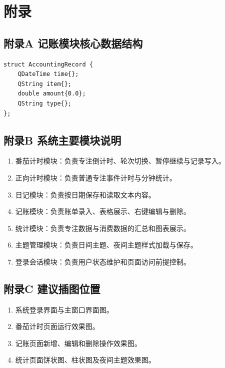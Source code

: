 \chapter{附录}

\section*{附录A 记账模块核心数据结构}

\begin{verbatim}
struct AccountingRecord {
    QDateTime time{};
    QString item{};
    double amount{0.0};
    QString type{};
};
\end{verbatim}

\section*{附录B 系统主要模块说明}
\begin{enumerate}
\item 番茄计时模块：负责专注倒计时、轮次切换、暂停继续与记录写入。
\item 正向计时模块：负责普通专注事件计时与分钟统计。
\item 日记模块：负责按日期保存和读取文本内容。
\item 记账模块：负责账单录入、表格展示、右键编辑与删除。
\item 统计模块：负责专注数据与消费数据的汇总和图表展示。
\item 主题管理模块：负责日间主题、夜间主题样式加载与保存。
\item 登录会话模块：负责用户状态维护和页面访问前提控制。
\end{enumerate}

\section*{附录C 建议插图位置}
\begin{enumerate}
\item 系统登录界面与主窗口界面图。
\item 番茄计时页面运行效果图。
\item 记账页面新增、编辑和删除操作效果图。
\item 统计页面饼状图、柱状图及夜间主题效果图。
\end{enumerate}